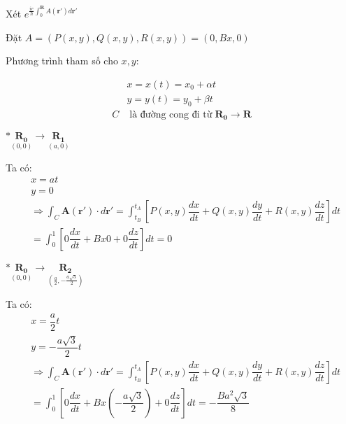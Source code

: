 \documentclass{report}
\begin{document}
\noindent Xét $e^{\frac{ie}{\hbar}\int_{0}^{\mathbf{R}}A(\mathbf{r'})d\mathbf{r'}}$

\noindent Đặt $A = \left(P(x,y),Q(x,y),R(x,y)\right) = (0,Bx,0)$

\noindent Phương trình tham số cho $x,y$:

\begin{align*}
	  & x = x(t) = x_0 + \alpha t                                            \\
	  & y = y(t) = y_0 + \beta t                                             \\
	C & \; \text{là đường cong đi từ} \; \mathbf{R_0} \rightarrow \mathbf{R}
\end{align*}

\clearpage

\noindent $\ast \underset{(0,0)}{\mathbf{R_0}}  \longrightarrow \underset{(a,0)}{\mathbf{R_1}}$

Ta có:
\begin{align*}
	 & x = at                                                                                                                                                                  \\
	 & y = 0                                                                                                                                                                   \\
	 & \Rightarrow \int_{C} \mathbf{A}(\mathbf{r'})\cdot d\mathbf{r'} =  \int_{t_B}^{t_A} \left[ P(x,y)\dfrac{dx}{dt} + Q(x,y)\dfrac{dy}{dt} + R(x,y)\dfrac{dz}{dt} \right] dt \\
	 & = \int_{0}^{1} \left[ 0\dfrac{dx}{dt} + Bx0 + 0\dfrac{dz}{dt} \right] dt = 0
\end{align*}

\noindent $\ast \underset{(0,0)}{\mathbf{R_0}}  \longrightarrow \underset{(\frac{a}{2},-\frac{a\sqrt{3}}{2})}{\mathbf{R_2}}$

Ta có:
\begin{align*}
	 & x = \dfrac{a}{2}t                                                                                                                                                       \\
	 & y = -\dfrac{a\sqrt{3}}{2}t                                                                                                                                              \\
	 & \Rightarrow \int_{C} \mathbf{A}(\mathbf{r'})\cdot d\mathbf{r'} =  \int_{t_B}^{t_A} \left[ P(x,y)\dfrac{dx}{dt} + Q(x,y)\dfrac{dy}{dt} + R(x,y)\dfrac{dz}{dt} \right] dt \\
	 & = \int_{0}^{1} \left[ 0\dfrac{dx}{dt} + Bx\left(-\dfrac{a\sqrt{3}}{2}\right) + 0\dfrac{dz}{dt} \right] dt = -\dfrac{Ba^2\sqrt{3}}{8}
\end{align*}
\end{document}

